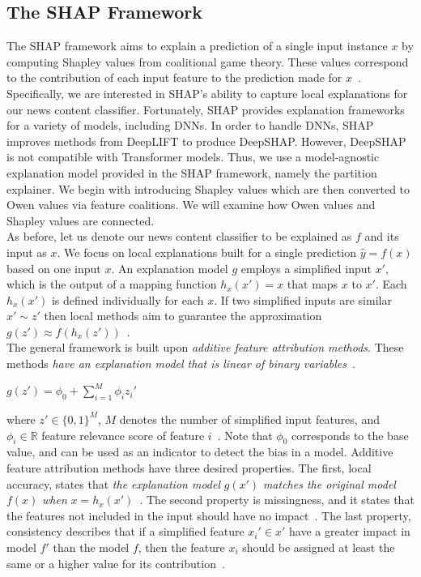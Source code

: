 \subsection{The SHAP Framework}
\label{subsec:ExplainingNewsContentModels_SHAPFramework}
The SHAP framework aims to explain a prediction of a single input instance $x$ by computing Shapley values from coalitional game theory. These values correspond to the contribution of each input feature to the prediction made for $x$~\parencite{InterpretableMachineLearning_Molnar}. Specifically, we are interested in SHAP's ability to capture local explanations
for our news content classifier. Fortunately, SHAP provides explanation frameworks for a variety of models, including DNNs. In order to handle DNNs, SHAP improves methods from DeepLIFT to produce DeepSHAP. However, DeepSHAP is not compatible with Transformer models. Thus, we use a model-agnostic explanation model provided in the SHAP framework, namely the partition explainer. We begin with introducing Shapley values which are then converted to Owen values via feature coalitions. We will examine how Owen values and Shapley values are connected.\\
As before, let us denote our news content classifier to be explained as $f$ and its input as $x$. We focus on local explanations built for a single prediction $\hat{y} = f(x)$ based on one input $x$. An explanation model $g$ employs a simplified input $x'$, which is the output of a mapping function $h_x(x') = x$ that maps $x$ to $x'$. Each $h_x(x')$ is defined individually for each $x$. If two simplified inputs are similar $x' \sim z'$ then local methods aim to guarantee the approximation $g(z') \approx f(h_x(z'))$~\parencite{AUnifiedApproach_Lundberg}.\\
The general framework is built upon \emph{additive feature attribution methods}. These methods \emph{have an explanation model that is linear of binary variables}~\parencite{AUnifiedApproach_Lundberg}.\\
\begin{center}
    $g(z') = \phi_0 + \sum\limits_{i=1}^M \phi_i z_i'$
\end{center}
where $z' \in \{0, 1\}^M$, $M$ denotes the number of simplified input features, and $\phi_i \in \mathbb{R}$ feature relevance score of feature $i$~\parencite{AUnifiedApproach_Lundberg}. Note that $\phi_0$ corresponds to the base value, and can be used as an indicator to detect the bias in a model. Additive feature attribution methods have three desired properties. The first, local accuracy, states that \emph{the explanation model} $g(x')$ \emph{matches the original model} $f(x)$ \emph{when} $x = h_x(x')$~\parencite{AUnifiedApproach_Lundberg}. The second property is missingness, and it states that the features not included in the input should have no impact~\parencite{AUnifiedApproach_Lundberg}. The last property, consistency describes that if a simplified feature $x_i' \in x'$ have a greater impact in model $f'$ than the model $f$, then the feature $x_i$ should be assigned at least the same or a higher value for its contribution~\parencite{AUnifiedApproach_Lundberg}. \\
